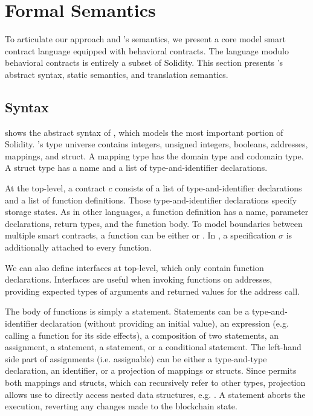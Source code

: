 \section{Formal Semantics} \label{sec:model}

To articulate our approach and \lang's semantics, we present a core model
smart contract language \corelang equipped with
behavioral contracts. The language modulo behavioral
contracts is entirely a subset of Solidity.
This section presents \corelang's abstract syntax, static semantics, and
translation semantics.



\subsection{Syntax}

 shows the abstract syntax of \corelang,
which models the most important portion of Solidity.
\corelang's type universe contains integers, unsigned integers, booleans,
addresses, mappings, and struct.
A mapping type has the domain type and codomain type.
A struct type has a name and a list of type-and-identifier declarations.

At the top-level, a contract $c$ consists of a list of type-and-identifier
declarations and a list of function definitions.
Those type-and-identifier declarations specify storage states.
As in other languages, a function definition has a name, parameter
declarations, return types, and the function body.  To model boundaries between
multiple smart contracts, a function can be either  or
.
In \corelang, a specification $\sigma$ is additionally attached to every function.

We can also define interfaces at top-level, which only contain function
declarations. Interfaces are useful when invoking functions on addresses,
providing expected types of arguments and returned values for the address call.

The body of functions is simply a statement.
Statements can be a type-and-identifier declaration (without providing an initial
value), an expression (e.g. calling a function for its side effects), a
composition of two statements, an assignment, a  statement, a  statement,
or a conditional statement.
The left-hand side part of assignments (i.e. assignable) can be either
a type-and-type declaration, an identifier, or a projection of mappings or structs.
Since \corelang permits both mappings and structs, which can recursively refer to
other types, projection allows use to directly access nested data structures,
e.g. .
A  statement aborts the execution, reverting any changes made to
the blockchain state.

